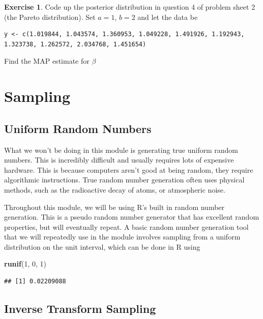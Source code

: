 \documentclass[
]{book}
\newenvironment{Shaded}{\begin{snugshade}}{\end{snugshade}}
\newcommand{\DecValTok}[1]{\textcolor[rgb]{0.00,0.00,0.81}{#1}}
\newcommand{\FunctionTok}[1]{\textcolor[rgb]{0.13,0.29,0.53}{\textbf{#1}}}
\newcommand{\NormalTok}[1]{#1}
\theoremstyle{definition}
\theoremstyle{definition}
\theoremstyle{definition}
\newtheorem{exercise}{Exercise}[chapter]
\theoremstyle{definition}
\theoremstyle{remark}
\begin{document}
\begin{exercise}
Code up the posterior distribution in question 4 of problem sheet 2 (the Pareto distribution). Set \(a = 1\), \(b = 2\) and let the data be

\begin{verbatim}
y <- c(1.019844, 1.043574, 1.360953, 1.049228, 1.491926, 1.192943, 1.323738, 1.262572, 2.034768, 1.451654)
\end{verbatim}

Find the MAP estimate for \(\beta\)
\end{exercise}

\hypertarget{sampling}{%
\chapter{Sampling}\label{sampling}}

\hypertarget{uniform-random-numbers}{%
\section{Uniform Random Numbers}\label{uniform-random-numbers}}

What we won't be doing in this module is generating true uniform random numbers. This is incredibly difficult and usually requires lots of expensive hardware. This is because computers aren't good at being random, they require algorithmic instructions. True random number generation often uses physical methods, such as the radioactive decay of atoms, or atmospheric noise.

Throughout this module, we will be using R's built in random number generation. This is a pseudo random number generator that has excellent random properties, but will eventually repeat. A basic random number generation tool that we will repeatedly use in the module involves sampling from a uniform distribution on the unit interval, which can be done in R using

\begin{Shaded}
\begin{Highlighting}[]
\FunctionTok{runif}\NormalTok{(}\DecValTok{1}\NormalTok{, }\DecValTok{0}\NormalTok{, }\DecValTok{1}\NormalTok{)}
\end{Highlighting}
\end{Shaded}

\begin{verbatim}
## [1] 0.02209088
\end{verbatim}

\hypertarget{inverse-transform-sampling}{%
\section{Inverse Transform Sampling}\label{inverse-transform-sampling}}
\end{document}
